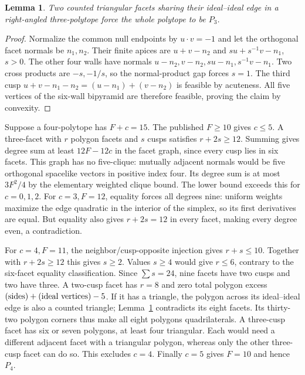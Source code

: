 \documentclass[11pt]{article}
\newtheorem{lemma}[theorem]{Lemma}
\begin{document}
\begin{lemma}\label{lem:two}
Two counted triangular facets sharing their ideal--ideal edge in a
right-angled three-polytope force the whole polytope to be $P_3$.
\end{lemma}
\begin{proof}
Normalize the common null endpoints by $u\cdot v=-1$ and let the
orthogonal facet normals be $n_1,n_2$. Their finite apices are
$u+v-n_2$ and $s u+s^{-1}v-n_1$, $s>0$. The other four walls have
normals $u-n_2,v-n_2,su-n_1,s^{-1}v-n_1$. Two cross products are
$-s,-1/s$, so the normal-product gap forces $s=1$.
The third cusp $u+v-n_1-n_2=(u-n_1)+(v-n_2)$ is feasible by acuteness.
All five vertices of the six-wall bipyramid are therefore feasible,
proving the claim by convexity.
\end{proof}

Suppose a four-polytope has $F+c=15$. The published $F\ge10$ gives
$c\le5$. A three-facet with $r$ polygon facets and $s$ cusps satisfies
$r+2s\ge12$. Summing gives degree sum at least $12F-12c$ in the facet
graph, since every cusp lies in six facets. This graph has no five-clique:
mutually adjacent normals would be five orthogonal spacelike vectors
in positive index four. Its degree sum is at most $3F^2/4$ by the
elementary weighted clique bound. The lower bound exceeds this for
$c=0,1,2$. For $c=3,F=12$, equality forces all degrees nine: uniform
weights maximize the edge quadratic in the interior of the simplex,
so its first derivatives are equal. But equality also gives
$r+2s=12$ in every facet, making every degree even, a contradiction.

For $c=4,F=11$, the neighbor/cusp-opposite injection gives $r+s\le10$.
Together with $r+2s\ge12$ this gives $s\ge2$. Values $s\ge4$ would
give $r\le6$, contrary to the six-facet equality classification.
Since $\sum s=24$, nine facets have two cusps and two have three.
A two-cusp facet has $r=8$ and zero total polygon excess
$(\hbox{sides})+(\hbox{ideal vertices})-5$. If it has a triangle, the
polygon across its ideal--ideal edge is also a counted triangle;
Lemma~\ref{lem:two} contradicts its eight facets.
Its thirty-two polygon corners thus make all eight polygons
quadrilaterals. A three-cusp facet has six or seven polygons, at least
four triangular. Each would need a different adjacent facet with a
triangular polygon, whereas only the other three-cusp facet can do so.
This excludes $c=4$. Finally $c=5$ gives $F=10$ and hence $P_4$.
\end{document}
